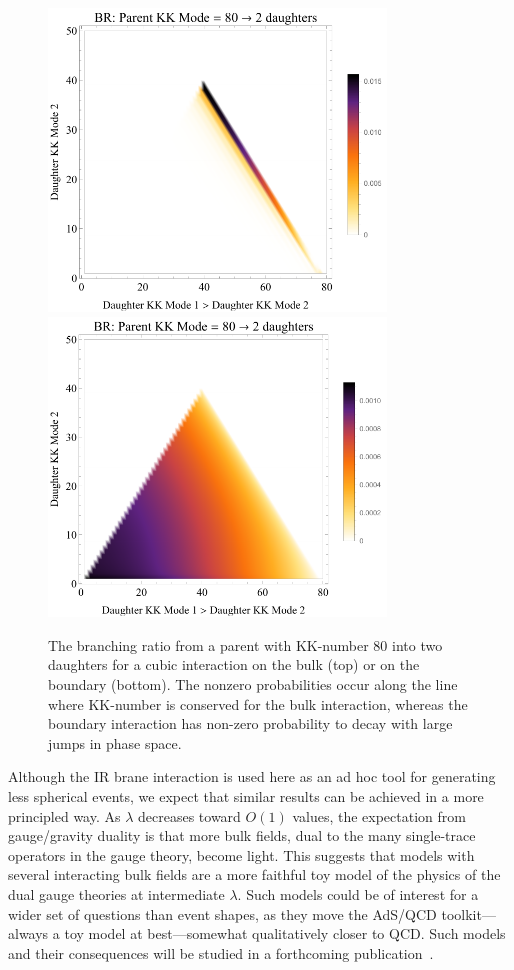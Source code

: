 \begin{figure}[tb!]
	\centering
	\includegraphics[width=0.8\textwidth]{figures/DS_KKBR_bulk.pdf}\vspace{1cm}
	\includegraphics[width=0.8\textwidth]{figures/DS_KKBR_boundary.pdf}
	\caption{The branching ratio from a parent with KK-number 80 into two daughters for a cubic interaction on the bulk (top) or on the boundary (bottom). The nonzero probabilities occur along the line where KK-number is conserved for the bulk interaction, whereas the boundary interaction has non-zero probability to decay with large jumps in phase space. }
	\label{fig:BR}
\end{figure}

Although the IR brane interaction is used here as an ad hoc tool for generating less spherical events, we expect that similar results can be achieved in a more principled way. As $\lambda$ decreases toward $O(1)$ values, the expectation from gauge/gravity duality is that more bulk fields, dual to the many single-trace operators in the gauge theory, become light. This suggests that models with several interacting bulk fields are a more faithful toy model of the physics of the dual gauge theories at intermediate $\lambda$. Such models could be of interest for a wider set of questions than event shapes, as they move the AdS/QCD toolkit---always a toy model at best---somewhat qualitatively closer to QCD. Such models and their consequences will be studied in a forthcoming publication~\cite{showersinprogress}.

